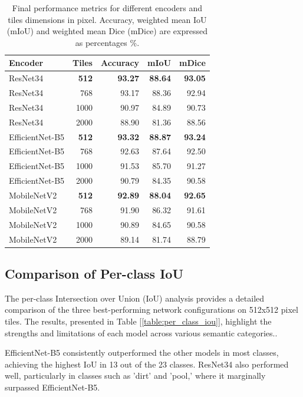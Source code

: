 \documentclass[a4paper]{article}
\begin{document}
\begin{table}[htbp]
    \centering
    \small
    \setlength{\tabcolsep}{3pt} %
    \begin{tabular}{|l|r|r|r|r|}
    \hline
    \textbf{Encoder} & \textbf{Tiles} & \textbf{Accuracy} & \textbf{mIoU} & \textbf{mDice} \\ \hline
     ResNet34 & \textbf{512} & \textbf{93.27} & \textbf{88.64} & \textbf{93.05} \\ \hline
    ResNet34 & 768 & 93.17 & 88.36 & 92.94 \\ \hline
    ResNet34 & 1000 & 90.97 & 84.89 & 90.73 \\ \hline
    ResNet34 & 2000 & 88.90 & 81.36 & 88.56 \\ \hline
    EfficientNet-B5 & \textbf{512} & \textbf{93.32} & \textbf{88.87} & \textbf{93.24} \\ \hline
    EfficientNet-B5 & 768 & 92.63 & 87.64 & 92.50 \\ \hline
    EfficientNet-B5 & 1000 & 91.53 & 85.70 & 91.27 \\ \hline
    EfficientNet-B5 & 2000 & 90.79 & 84.35 & 90.58 \\ \hline
    MobileNetV2 & \textbf{512} & \textbf{92.89} & \textbf{88.04} & \textbf{92.65} \\ \hline
    MobileNetV2 & 768 & 91.90 & 86.32 & 91.61 \\ \hline
    MobileNetV2 & 1000 & 90.89 & 84.65 & 90.58 \\ \hline
    MobileNetV2 & 2000 & 89.14 & 81.74 & 88.79 \\ \hline
    \end{tabular}
    \caption{Final performance metrics for different encoders and tiles dimensions in pixel. Accuracy, weighted mean IoU (mIoU) and weighted mean Dice (mDice) are expressed as percentages \%.}
    \label{table:performance_metrics}
\end{table}

\subsection{Comparison of Per-class IoU}
The per-class Intersection over Union (IoU) analysis provides a detailed comparison of the three best-performing network configurations on 512x512 pixel tiles. The results, presented in Table [\ref{table:per_class_iou}], highlight the strengths and limitations of each model across various semantic categories.. 

EfficientNet-B5 consistently outperformed the other models in most classes, achieving the highest IoU in 13 out of the 23 classes. ResNet34 also performed well, particularly in classes such as 'dirt' and 'pool,' where it marginally surpassed EfficientNet-B5.
\end{document}
